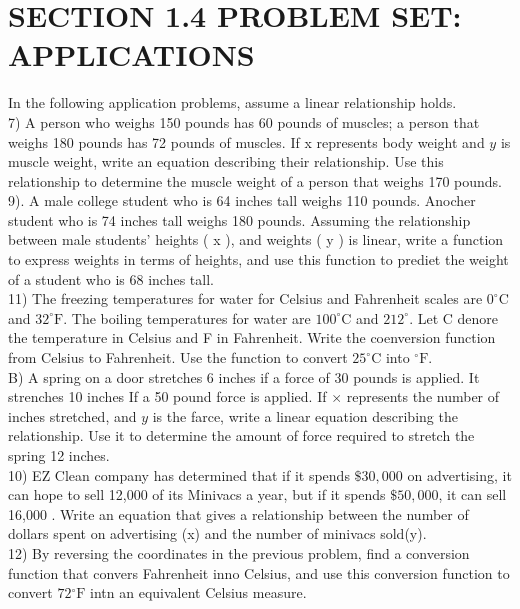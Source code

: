 \section*{SECTION 1.4 PROBLEM SET: APPLICATIONS}
In the following application problems, assume a linear relationship holds.\\
7) A person who weighs 150 pounds has 60 pounds of muscles; a person that weighs 180 pounds has 72 pounds of muscles. If x represents body weight and $y$ is muscle weight, write an equation describing their relationship. Use this relationship to determine the muscle weight of a person that weighs 170 pounds.\\
9). A male college student who is 64 inches tall weighs 110 pounds. Anocher student who is 74 inches tall weighs 180 pounds. Assuming the relationship between male students' heights ( x ), and weights ( y ) is linear, write a function to express weights in terms of heights, and use this function to prediet the weight of a student who is 68 inches tall.\\
11) The freezing temperatures for water for Celsius and Fahrenheit scales are $0^{\circ} \mathrm{C}$ and $32^{\circ} \mathrm{F}$. The boiling temperatures for water are $100^{\circ} \mathrm{C}$ and $212^{\circ}$. Let C denore the temperature in Celsius and F in Fahrenheit. Write the coenversion function from Celsius to Fahrenheit. Use the function to convert $25^{\circ} \mathrm{C}$ into ${ }^{\circ} \mathrm{F}$.\\
B) A spring on a door stretches 6 inches if a force of 30 pounds is applied. It strenches 10 inches If a 50 pound force is applied. If $\times$ represents the number of inches stretched, and $y$ is the farce, write a linear equation describing the relationship. Use it to determine the amount of force required to stretch the spring 12 inches.\\
10) EZ Clean company has determined that if it spends $\$ 30,000$ on advertising, it can hope to sell 12,000 of its Minivacs a year, but if it spends $\$ 50,000$, it can sell 16,000 . Write an equation that gives a relationship between the number of dollars spent on advertising (x) and the number of minivacs sold(y).\\
12) By reversing the coordinates in the previous problem, find a conversion function that convers Fahrenheit inno Celsius, and use this conversion function to convert $72{ }^{\circ} \mathrm{F}$ intn an equivalent Celsius measure.

